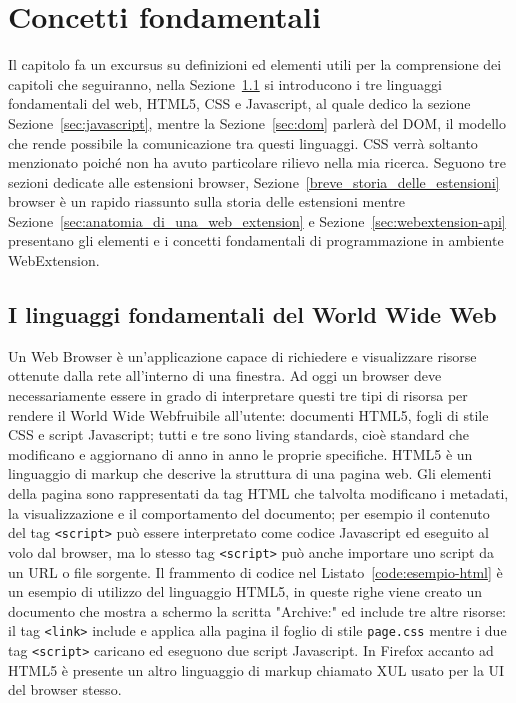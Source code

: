 \documentclass{sapthesis}
\newcommand{\code}[1]{\texttt{#1}}
\newcommand{\refSection}[1]{Sezione~\ref{#1}}
\newcommand{\Sezione}[1]{Sezione~\ref{#1}}
\newcommand{\www}{World Wide Web}
\newcommand{\tagHTML}[1]{\code{<#1>}}
\newcommand{\script}{\tagHTML{script}}
\begin{document}
\chapter{Concetti fondamentali}
\label{cap:concetti-fondamentali}
    Il capitolo fa un excursus su definizioni ed elementi utili per la comprensione dei capitoli che seguiranno,
    nella \Sezione{sec:I-linguaggi-fondamentali-del-www} si introducono i tre linguaggi fondamentali del web, HTML5,
    CSS e Javascript, al quale dedico la sezione \Sezione{sec:javascript}, mentre la \refSection{sec:dom} parlerà del DOM,
    il modello che rende possibile la comunicazione tra questi linguaggi. CSS verrà soltanto menzionato poiché non ha
    avuto particolare rilievo nella mia ricerca. Seguono tre sezioni dedicate alle estensioni browser, \Sezione{breve_storia_delle_estensioni}
     browser  è un rapido riassunto sulla storia delle estensioni
    mentre \Sezione{sec:anatomia_di_una_web_extension} e \refSection{sec:webextension-api} presentano gli elementi e
    i concetti fondamentali di programmazione in ambiente WebExtension.


    \section{I linguaggi fondamentali del \www{}}
    \label{sec:I-linguaggi-fondamentali-del-www}
        Un Web Browser è un'applicazione capace di richiedere e visualizzare risorse ottenute dalla rete
        all'interno di una finestra.
        Ad oggi un browser deve necessariamente essere in grado di interpretare questi tre tipi di risorsa 
        per rendere il \www fruibile all'utente: documenti HTML5, fogli di stile CSS e script Javascript;
        tutti e tre sono living standards, cioè standard che modificano e aggiornano di anno in anno le
        proprie specifiche.
        HTML5 è un linguaggio di markup che descrive la struttura di una pagina web. Gli elementi della 
        pagina sono rappresentati da tag HTML che talvolta modificano i metadati, la visualizzazione e 
        il comportamento del documento; per esempio il contenuto del tag \script{} può essere interpretato 
        come codice Javascript ed eseguito al volo dal browser, ma lo stesso tag \script{} può anche importare
        uno script da un URL o file sorgente.
        Il frammento di codice nel Listato~\ref{code:esempio-html} è un esempio di utilizzo del linguaggio HTML5, in queste
        righe viene creato un documento che mostra a schermo la scritta "Archive:" ed include tre altre risorse:
        il tag \code{<link>} include e applica alla pagina il foglio di stile \code{page.css} mentre i due tag
        \script{} caricano ed eseguono due script Javascript.
        In Firefox accanto ad HTML5 è presente un altro linguaggio di markup 
        chiamato XUL usato per la UI del browser stesso.
\end{document}
